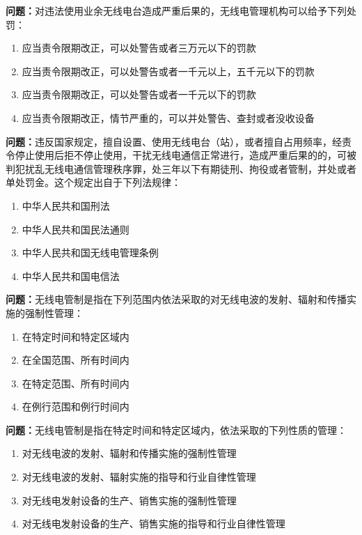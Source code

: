 \bigskip


\noindent\textbf{问题：}对违法使用业余无线电台造成严重后果的，无线电管理机构可以给予下列处罚：
\begin{enumerate}[label=\Alph*), leftmargin=3em]
\item 应当责令限期改正，可以处警告或者三万元以下的罚款
\item 应当责令限期改正，可以处警告或者一千元以上，五千元以下的罚款
\item 应当责令限期改正，可以处警告或者一千元以下的罚款
\item 应当责令限期改正，情节严重的，可以并处警告、查封或者没收设备
\end{enumerate}

\bigskip


\noindent\textbf{问题：}违反国家规定，擅自设置、使用无线电台（站），或者擅自占用频率，经责令停止使用后拒不停止使用，干扰无线电通信正常进行，造成严重后果的的，可被判犯扰乱无线电通信管理秩序罪，处三年以下有期徒刑、拘役或者管制，并处或者单处罚金。这个规定出自于下列法规律：
\begin{enumerate}[label=\Alph*), leftmargin=3em]
\item 中华人民共和国刑法
\item 中华人民共和国民法通则
\item 中华人民共和国无线电管理条例
\item 中华人民共和国电信法
\end{enumerate}

\bigskip


\noindent\textbf{问题：}无线电管制是指在下列范围内依法采取的对无线电波的发射、辐射和传播实施的强制性管理：
\begin{enumerate}[label=\Alph*), leftmargin=3em]
\item 在特定时间和特定区域内
\item 在全国范围、所有时间内
\item 在特定范围、所有时间内
\item 在例行范围和例行时间内
\end{enumerate}

\bigskip


\noindent\textbf{问题：}无线电管制是指在特定时间和特定区域内，依法采取的下列性质的管理：
\begin{enumerate}[label=\Alph*), leftmargin=3em]
\item 对无线电波的发射、辐射和传播实施的强制性管理
\item 对无线电波的发射、辐射实施的指导和行业自律性管理
\item 对无线电发射设备的生产、销售实施的强制性管理
\item 对无线电发射设备的生产、销售实施的指导和行业自律性管理
\end{enumerate}

